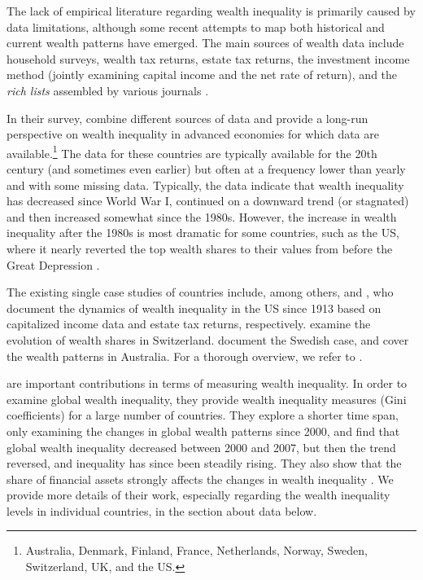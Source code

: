 \documentclass[a4paper,11pt]{article}
\begin{document}
The lack of empirical literature regarding wealth inequality is primarily caused by data limitations, although some recent attempts to map both historical and current wealth patterns have emerged. The main sources of wealth data include household surveys, wealth tax returns, estate tax returns, the investment income method (jointly examining capital income and the net rate of return), and the \textit{rich lists} assembled by various journals \citep{davies2000distribution}. 

In their survey, \citet{roine2015long} combine different sources of data and provide a long-run perspective on wealth inequality in advanced economies for which data are available.\footnote{Australia, Denmark, Finland, France, Netherlands, Norway, Sweden, Switzerland, \ac{UK}, and the \ac{US}.} The data for these countries are typically available for the 20th century (and sometimes even earlier) but often at a frequency lower than yearly and with some missing data. Typically, the data indicate that wealth inequality has decreased since World War I, continued on a downward trend (or stagnated) and then increased somewhat since the 1980s. However, the increase in wealth inequality after the 1980s is most dramatic for some countries, such as the \ac{US}, where it nearly reverted the top wealth shares to their values from before the Great Depression \citep{piketty2014}. 

The existing single case studies of countries include, among others, \citet{SaezZucman2016} and \citet{kopczuksaez2004}, who document the dynamics of wealth inequality in the \ac{US} since 1913 based on capitalized income data and estate tax returns, respectively. \citet{dell2007income} examine the evolution of wealth shares in Switzerland. \citet{roine2009wealth} document the Swedish case, and \citet{katic2016top} cover the wealth patterns in Australia. For a thorough overview, we refer to \citet{roine2015long}.

\citet{daviesetal2017,daviesetal2011,davies2000distribution} are important contributions in terms of measuring wealth inequality. In order to examine global wealth inequality, they provide wealth inequality measures (Gini coefficients) for a large number of countries. They explore a shorter time span, only examining the changes in global wealth patterns since 2000, and find that global wealth inequality decreased between 2000 and 2007, but then the trend reversed, and inequality has since been steadily rising. They also show that the share of financial assets strongly affects the changes in wealth inequality \citep{daviesetal2017}. We provide more details of their work, especially regarding the wealth inequality levels in individual countries, in the section about data below.
\end{document}

